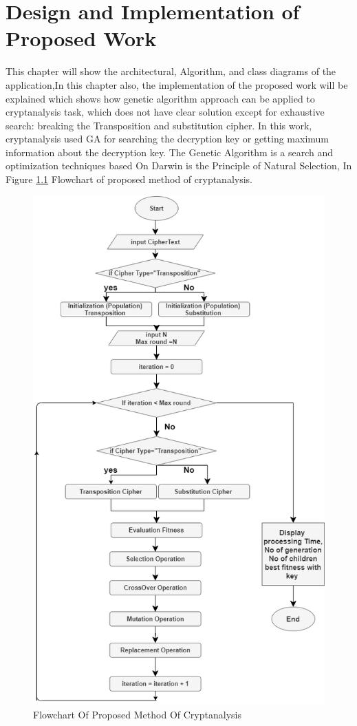 
\chapter{Design and Implementation of Proposed Work}
This chapter will show the architectural, Algorithm, and class diagrams of the application,In this chapter also, the implementation of the proposed work will be explained which shows how genetic algorithm approach can be applied to cryptanalysis task, which does not have clear solution except for exhaustive search: breaking the Transposition and substitution cipher.
In this work, cryptanalysis used GA for searching the decryption key or getting maximum information about the decryption key. The Genetic Algorithm is a search and optimization techniques based On Darwin is the Principle of Natural Selection,
In Figure \ref{Cryptanalysis_flow} Flowchart of proposed method of cryptanalysis.
\begin{figure}[ht]
	\centering
	\includegraphics[width=.8\textwidth]{imagenes/FlowChartOfCry.png}
    \caption{Flowchart Of Proposed Method Of Cryptanalysis}
    \label{Cryptanalysis_flow}
\end{figure}
